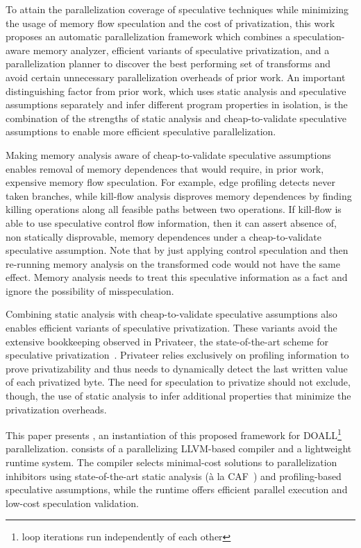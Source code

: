 To attain the parallelization coverage of speculative techniques
while minimizing the usage of memory flow speculation and the cost of
privatization,
%
this work proposes an automatic parallelization framework which
combines a speculation-aware memory analyzer, efficient variants of
speculative privatization, and a parallelization planner
to discover the best performing set of transforms and avoid certain
unnecessary parallelization overheads of prior work.
%
An important distinguishing factor from prior work, which uses static
analysis and speculative assumptions separately and infer different
program properties in isolation, is the combination of the strengths of
static analysis and cheap-to-validate speculative assumptions to
enable more efficient speculative parallelization.

Making memory analysis aware of cheap-to-validate speculative
assumptions enables removal of memory dependences that would require,
in prior work, expensive memory flow speculation.
%
For example, edge profiling detects never taken branches, while
kill-flow analysis disproves memory dependences by finding killing
operations along all feasible paths between two operations. If
kill-flow is able to use speculative control flow information, then it
can assert absence of, non statically disprovable, memory dependences
under a cheap-to-validate speculative assumption.
Note that by just applying control speculation and then re-running
memory analysis on the transformed code would not have the same
effect.  Memory analysis needs to treat this speculative information
as a fact and ignore the possibility of misspeculation.

Combining static analysis with cheap-to-validate speculative
assumptions also enables efficient variants of speculative
privatization.
%
These variants avoid the extensive bookkeeping observed in
Privateer, the state-of-the-art scheme for speculative
privatization~\cite{johnson:12:pldi}.
%
Privateer relies exclusively on profiling
information to prove privatizability and thus needs to dynamically
detect the last written value of each privatized byte.
%
The need for speculation to privatize should not exclude, though, the
use of static analysis to infer additional properties that minimize
the privatization overheads.

This paper presents \name, an instantiation of this proposed framework
for DOALL\footnote{loop iterations run independently of each other}
parallelization. \name consists of a parallelizing LLVM-based compiler
and a lightweight
runtime system. The compiler selects minimal-cost solutions to
parallelization inhibitors using state-of-the-art static analysis
(\`{a} la CAF~\cite{johnson:14:pldi}) and profiling-based speculative
assumptions, while the runtime offers efficient parallel execution and
low-cost speculation validation.

